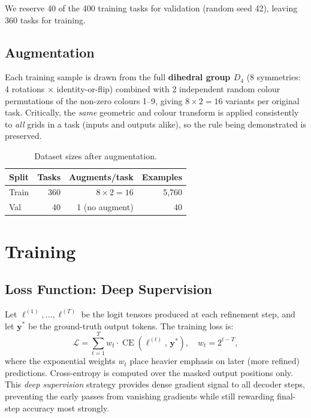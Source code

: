 \documentclass[11pt,a4paper]{article}
\begin{document}
We reserve 40 of the 400 training tasks for validation (random seed 42), leaving 360
tasks for training.

\subsection{Augmentation}

Each training sample is drawn from the full \textbf{dihedral group $D_4$} (8 symmetries:
4 rotations $\times$ identity-or-flip) combined with 2 independent random colour
permutations of the non-zero colours 1--9, giving $8 \times 2 = 16$ variants per
original task.  Critically, the \emph{same} geometric and colour transform is applied
consistently to \emph{all} grids in a task (inputs and outputs alike), so the rule
being demonstrated is preserved.

\begin{table}[H]
\centering
\caption{Dataset sizes after augmentation.}
\label{tab:dataset}
\begin{tabular}{lrrr}
\toprule
Split & Tasks & Augments/task & Examples \\
\midrule
Train & 360 & $8 \times 2 = 16$ & 5{,}760 \\
Val   & 40  & 1 (no augment)  & 40 \\
\bottomrule
\end{tabular}
\end{table}

\section{Training}
\label{sec:training}

\subsection{Loss Function: Deep Supervision}

Let $\ell^{(1)}, \ldots, \ell^{(T)}$ be the logit tensors produced at each refinement
step, and let $\mathbf{y}^*$ be the ground-truth output tokens.  The training loss is:
\[
  \mathcal{L}
  = \sum_{t=1}^{T} w_t \cdot \operatorname{CE}\!\left(\ell^{(t)},\, \mathbf{y}^*\right),
  \quad w_t = 2^{t - T},
\]
where the exponential weights $w_t$ place heavier emphasis on later (more refined)
predictions.  Cross-entropy is computed over the masked output positions only.  This
\emph{deep supervision} strategy provides dense gradient signal to all decoder steps,
preventing the early passes from vanishing gradients while still rewarding final-step
accuracy most strongly.
\end{document}
